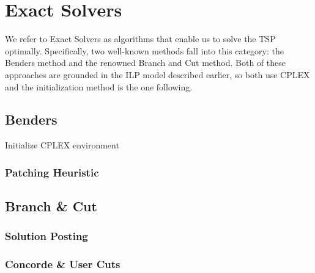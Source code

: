 \chapter{Exact Solvers}

We refer to Exact Solvers as algorithms that enable us to solve the TSP optimally. Specifically, two well-known methods fall into this category: the Benders method and the renowned Branch and Cut method. Both of these approaches are grounded in the ILP model described earlier, so both use CPLEX and the initialization method is the one following.

\section{Benders}

\begin{algorithm}[H]
	\vspace{2mm}
	Initialize CPLEX environment \\
\end{algorithm}

\subsection{Patching Heuristic}

\section{Branch \& Cut}

\subsection{Solution Posting}

\subsection{Concorde \& User Cuts}